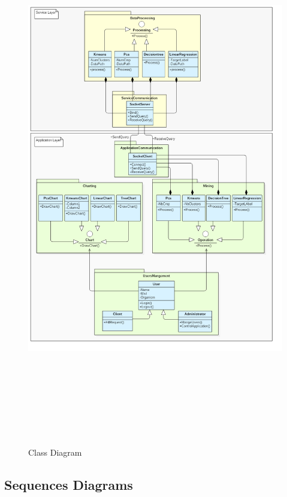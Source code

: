 \begin{figure}[!ht]
\begin{center}
\includegraphics[width=17cm,height=23.5cm]{chapter4/class.png}
\end{center}
\caption{Class Diagram}
\label{class}
\end{figure}


\subsection{Sequences Diagrams}
